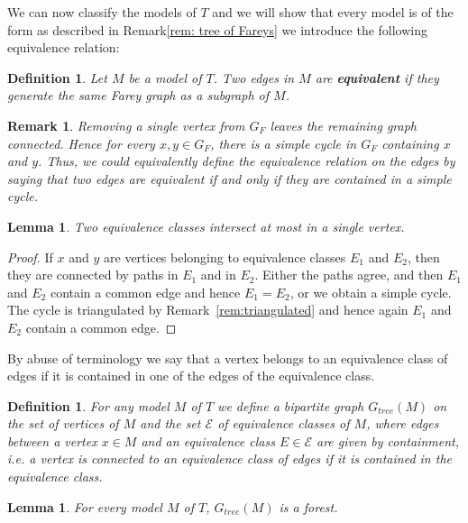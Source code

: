 \documentclass{amsart}
\newcommand{\E}{\mathcal{E}}
\newtheorem{definition}[defi]{Definition}
\newtheorem{lemma}[defi]{Lemma}
\newtheorem{remark}[defi]{Remark}
\begin{document}
We can now classify the models of $T$ and we will show that every model is of the form as described in Remark\ref{rem: tree of Fareys} we introduce the following equivalence relation: 

\begin{definition}
    Let $M$ be a  model of $T$.
   Two edges in $M$ are \textbf{equivalent} if they generate the same Farey graph as a subgraph of $M$. 
\end{definition}


\begin{remark}
    Removing a single vertex from $G_F$ leaves the remaining graph connected. Hence for every $x, y \in G_F$, there is a simple cycle in $G_F$ containing $x$ and $y$. Thus, we could equivalently  define the equivalence relation on the edges by saying that two edges are equivalent if and only if they are contained in a simple cycle.
\end{remark}

\begin{lemma}\label{cluster_lemma}
    Two equivalence classes intersect at most in a single vertex.
    
\end{lemma}

\begin{proof}
    If $x$ and $y$ are vertices belonging to equivalence classes $E_1$ and $E_2$, then they
    are connected by paths in $E_1$ and in $E_2$. Either the paths agree, and
    then $E_1$ and $E_2$ contain a common edge and hence $E_1 = E_2$, or we obtain a simple
    cycle. The cycle is triangulated by Remark~\ref{rem:triangulated} and hence again $E_1$ and $E_2$ contain a common edge.
\end{proof}
 
By abuse of terminology we say that a vertex belongs to an equivalence class of edges if it is contained in one of the edges of the equivalence class.

\begin{definition}\label{def:tree}
For any model $M$ of $T$ we define a bipartite graph $G_{tree}(M)$ on the set of vertices of $M$
and the set $\E$ of equivalence classes of $M$, where edges between a vertex $x\in M$ and an equivalence class $E\in\E$ are given by containment,
i.e. a vertex is connected to an equivalence class of edges if it is contained in the equivalence class.
\end{definition}

\begin{lemma}
    For every model $M$ of $T$, $G_{tree}(M)$ is a forest.
\end{lemma}
\end{document}
